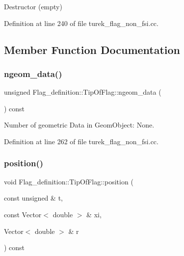 Destructor (empty) 



Definition at line 240 of file turek\+\_\+flag\+\_\+non\+\_\+fsi.\+cc.



\subsection{Member Function Documentation}
\mbox{\label{classFlag__definition_1_1TipOfFlag_a7571a5cbebe6de6c4ee42de5f2fe3dd8}} 
\subsubsection{\texorpdfstring{ngeom\+\_\+data()}{ngeom\_data()}}
{\footnotesize\ttfamily unsigned Flag\+\_\+definition\+::\+Tip\+Of\+Flag\+::ngeom\+\_\+data (\begin{DoxyParamCaption}{ }\end{DoxyParamCaption}) const\hspace{0.3cm}{\ttfamily [inline]}}



Number of geometric Data in Geom\+Object\+: None. 



Definition at line 262 of file turek\+\_\+flag\+\_\+non\+\_\+fsi.\+cc.

\mbox{\label{classFlag__definition_1_1TipOfFlag_afcc0a2176290bbb7d1bb4adf9c231991}} 
\subsubsection{\texorpdfstring{position()}{position()}\hspace{0.1cm}{\footnotesize\ttfamily [1/2]}}
{\footnotesize\ttfamily void Flag\+\_\+definition\+::\+Tip\+Of\+Flag\+::position (\begin{DoxyParamCaption}\item[{const unsigned \&}]{t,  }\item[{const Vector$<$ double $>$ \&}]{xi,  }\item[{Vector$<$ double $>$ \&}]{r }\end{DoxyParamCaption}) const\hspace{0.3cm}{\ttfamily [inline]}}



